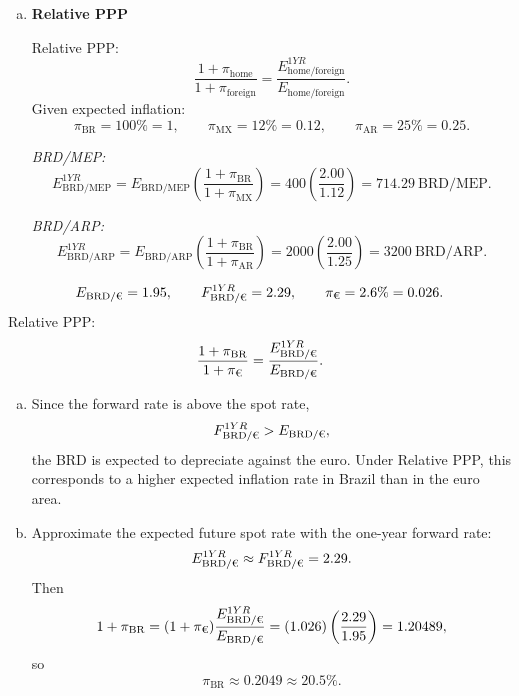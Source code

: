\documentclass[11pt]{article}
\newenvironment{problem}[2][Problem]{\begin{trivlist}
\item[\hskip \labelsep {\bfseries #1}\hskip \labelsep {\bfseries #2.}]
\leavevmode\par
}{\end{trivlist}}
\begin{document}
\begin{problem}{1}
\begin{enumerate}[(a)]
  \item \textbf{Relative PPP}

  Relative PPP:
  \[
  \frac{1+\pi_{\text{home}}}{1+\pi_{\text{foreign}}}
  =\frac{E_{\text{home/foreign}}^{1YR}}{E_{\text{home/foreign}}}.
  \]
  Given expected inflation:
  \[
  \pi_{\text{BR}}=100\%=1,\qquad
  \pi_{\text{MX}}=12\%=0.12,\qquad
  \pi_{\text{AR}}=25\%=0.25.
  \]

  \emph{BRD/MEP:}
  \[
  E_{\text{BRD/MEP}}^{1YR}
  = E_{\text{BRD/MEP}}
    \left(\frac{1+\pi_{\text{BR}}}{1+\pi_{\text{MX}}}\right)
  = 400\left(\frac{2.00}{1.12}\right)
  = 714.29~\text{BRD/MEP}.
  \]

  \emph{BRD/ARP:}
  \[
  E_{\text{BRD/ARP}}^{1YR}
  = E_{\text{BRD/ARP}}
    \left(\frac{1+\pi_{\text{BR}}}{1+\pi_{\text{AR}}}\right)
  = 2000\left(\frac{2.00}{1.25}\right)
  = 3200~\text{BRD/ARP}.
  \]
\end{enumerate}
\end{problem}

\begin{problem}{2}

\[
E_{\text{BRD/}\text{\texteuro}}=1.95,\qquad
F_{\text{BRD/}\text{\texteuro}}^{1YR}=2.29,
\qquad
\pi_{\text{\texteuro}}=2.6\%=0.026.
\]
Relative PPP:
\[
\frac{1+\pi_{\text{BR}}}{1+\pi_{\text{\texteuro}}}
=\frac{E_{\text{BRD/}\text{\texteuro}}^{1YR}}{E_{\text{BRD/}\text{\texteuro}}}.
\]

\begin{enumerate}[(a)]
  \item Since the forward rate is above the spot rate,
  \[
  F_{\text{BRD/}\text{\texteuro}}^{1YR} > E_{\text{BRD/}\text{\texteuro}},
  \]
  the BRD is expected to depreciate against the euro. Under Relative PPP, this corresponds to a higher expected inflation rate in Brazil than in the euro area.

  \item Approximate the expected future spot rate with the one-year forward rate:
  \[
  E_{\text{BRD/}\text{\texteuro}}^{1YR}\approx F_{\text{BRD/}\text{\texteuro}}^{1YR}=2.29.
  \]
  Then
  \[
  1+\pi_{\text{BR}}
  =(1+\pi_{\text{\texteuro}})\frac{E_{\text{BRD/}\text{\texteuro}}^{1YR}}{E_{\text{BRD/}\text{\texteuro}}}
  = (1.026)\left(\frac{2.29}{1.95}\right)
  = 1.20489,
  \]
  so
  \[
  \pi_{\text{BR}} \approx 0.2049 \approx 20.5\%.
  \]
\end{enumerate}
\end{problem}
\end{document}
